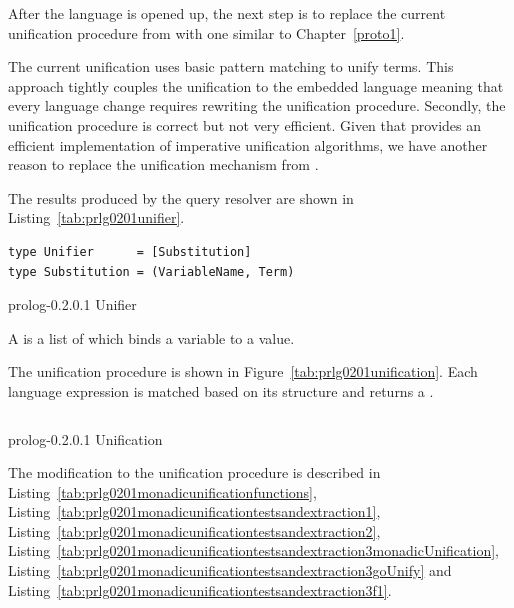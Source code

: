 \documentclass[thesis-solanki.tex]{subfiles}
\begin{document}
After the language is opened up, the next step is to replace the current unification procedure from  \cite{prolog-lib} with one 
similar to Chapter~\ref{proto1}.


The current unification uses basic pattern matching to unify terms. This approach tightly couples the unification to the embedded language meaning that every 
language change requires rewriting the unification procedure. Secondly, the unification procedure is correct but not very efficient. Given that 
 \cite{unification-fd-lib} provides an efficient implementation of imperative unification algorithms, we have another reason to 
replace the unification mechanism from  \cite{prolog-lib}.  

The results produced by the query resolver are shown in Listing~\ref{tab:prlg0201unifier}.
\begin{code-list}[H]
\begin{verbatim}
type Unifier      = [Substitution]
type Substitution = (VariableName, Term)
\end{verbatim}
\caption{prolog-0.2.0.1 Unifier}
\label{tab:prlg0201unifier}
\end{code-list}

A  is a list of  which binds a variable to a value.

The unification procedure is shown in Figure~\ref{tab:prlg0201unification}.
Each language expression is matched based on its structure and returns a  . 


\begin{code-list}[H]
  \begin{singlespace}
    \inputminted[linenos]{haskell}{haskell-proto2-unification-lion.hs}
  \end{singlespace}
\caption{prolog-0.2.0.1 Unification}
\label{tab:prlg0201unification}
\end{code-list}

The modification to the unification procedure is described in Listing~\ref{tab:prlg0201monadicunificationfunctions}, 
Listing~\ref{tab:prlg0201monadicunificationtestsandextraction1}, Listing~\ref{tab:prlg0201monadicunificationtestsandextraction2}, 
Listing~\ref{tab:prlg0201monadicunificationtestsandextraction3monadicUnification}, 
Listing~\ref{tab:prlg0201monadicunificationtestsandextraction3goUnify} and 
Listing~\ref{tab:prlg0201monadicunificationtestsandextraction3f1}.
\end{document}
